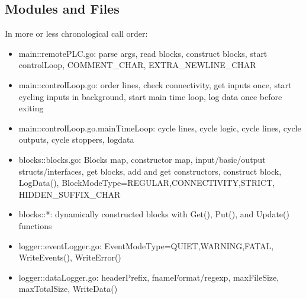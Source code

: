 \documentclass[a4paper]{article}
\begin{document}
\subsection{Modules and Files}
In more or less chronological call order:
\begin{itemize}
  \item main::remotePLC.go: parse args, read blocks, construct blocks, start controlLoop, COMMENT\_CHAR, EXTRA\_NEWLINE\_CHAR
  \item main::controlLoop.go: order lines, check connectivity, get inputs once, start cycling inputs in background, start main time loop, log data once before exiting
  \item main::controlLoop.go.mainTimeLoop: cycle lines, cycle logic, cycle lines, cycle outputs, cycle stoppers, logdata
  \item blocks::blocks.go: Blocks map, constructor map, input/basic/output structs/interfaces, get blocks, add and get constructors, construct block, LogData(), BlockModeType=REGULAR,CONNECTIVITY,STRICT, HIDDEN\_SUFFIX\_CHAR
  \item blocks::*: dynamically constructed blocks with Get(), Put(), and Update() functions
  \item logger::eventLogger.go: EventModeType=QUIET,WARNING,FATAL, WriteEvents(), WriteError()
  \item logger::dataLogger.go: headerPrefix, fnameFormat/regexp, maxFileSize, maxTotalSize, WriteData()
\end{itemize}
\end{document}
